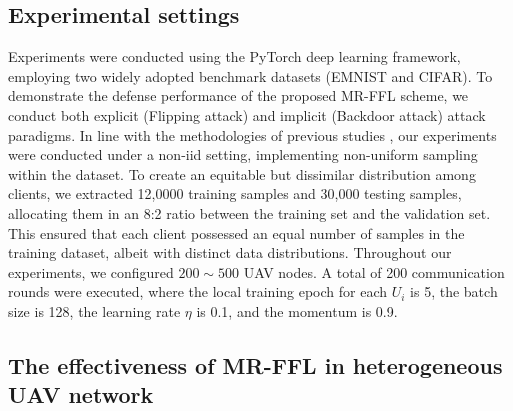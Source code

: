 \documentclass[lettersize,journal]{IEEEtran}
\begin{document}
\subsection{Experimental settings}
Experiments were conducted using the PyTorch deep learning framework, employing two widely adopted benchmark datasets (EMNIST and CIFAR). To demonstrate the defense performance of the proposed MR-FFL scheme, we conduct both explicit (Flipping attack) and implicit (Backdoor attack) attack paradigms. %
In line with the methodologies of previous studies \cite{mohri2019agnostic,tan2022fedproto, zeng2022heterogeneous}, our experiments were conducted under a non-iid setting, implementing non-uniform sampling within the dataset. 
To create an equitable but dissimilar distribution among clients, we extracted 12,0000 training samples and 30,000 testing samples, allocating them in an 8:2 ratio between the training set and the validation set. This ensured that each client possessed an equal number of samples in the training dataset, albeit with distinct data distributions. %
Throughout our experiments, we configured $200\sim 500$ UAV nodes. A total of 200 communication rounds were executed, where the local training epoch for each $U_i$ is 5, the batch size is 128, the learning rate $\eta$ is 0.1, and the momentum is 0.9. 


\subsection{The effectiveness of MR-FFL in heterogeneous UAV network}
\end{document}

